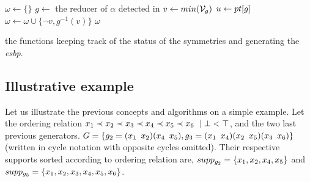  \begin{algorithm}[!htbp]
  
  
  
  
  
  
  {
   $\omega \gets \{\}$\;
   $g \gets$ the reducer of $\alpha$ detected in \isNotMinimal\;
   $v \gets min(\mathcal{V}_g)$\;
   $u \gets pt[g] $\;
   $\omega \gets \omega \cup \{\neg v, g^{-1}(v)\}$\;
   \Return $\omega$
  }
  \caption{the functions keeping track of the status of the symmetries and generating the \emph{esbp}.}
  \label{algo:keep_status}
  
 \end{algorithm}
 
 
 
 \subsection{Illustrative example}
  Let us illustrate the previous concepts and algorithms on a simple example. Let the ordering relation $x_1 \prec x_2 \prec x_3 \prec x_4
 \prec x_5 \prec x_6\ \mid \bot < \top$, and the two last previous generators.
 $G = \{
  g_2 = (x_1 \enskip x_2)(x_4 \enskip x_5),g_3 = (x_1 \enskip x_4)(x_2 \enskip x_5)(x_3 \enskip x_6)\}$
 (written in cycle notation with opposite cycles omitted). Their
 respective supports sorted according to ordering relation are, $supp_{g_{2}} = \{x_1, x_2, x_4, x_5\}$ and
 $supp_{g_3} = \{x_1, x_2, x_3, x_4, x_5, x_6\}$.
 
